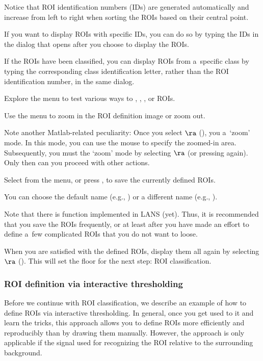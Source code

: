 \bul Notice that ROI identification numbers (IDs) are generated automatically and increase from left to right when sorting the ROIs based on their central point.

\bul If you want to display ROIs with specific IDs, you can do so by typing the IDs in the dialog that opens after you choose to display the ROIs.

\bul If the ROIs have been classified, you can display ROIs from a~specific class by typing the corresponding class identification letter, rather than the ROI identification number, in the same dialog.

\s Explore the  menu to test various ways to , , , or  ROIs.

\s Use the  menu to zoom in the ROI definition image or zoom out.

\bul Note another Matlab-related peculiarity: Once you select  $\ra$  (), you  a~`zoom' mode. In this mode, you can use the mouse to specify the zoomed-in area. Subsequently, you must  the `zoom' mode by selecting  $\ra$  (or pressing  again). Only then can you proceed with other actions.

\s Select  from the menu, or press , to save the currently defined ROIs. 

\bul You can choose the default name (e.g., ) or a different name (e.g., ).

\bul Note that there is  function implemented in LANS (yet). Thus, it is recommended that you save the ROIs frequently, or at least after you have made an effort to define a~few complicated ROIs that you do not want to loose.

\s When you are satisfied with the defined ROIs, display them all again by selecting  $\ra$  (). This will set the floor for the next step: ROI classification.


\subsubsection{ROI definition via interactive thresholding}
\setcounter{step}{0}

Before we continue with ROI classification, we describe an example of how to define ROIs via interactive thresholding. In general, once you get used to it and learn the tricks, this approach allows you to define ROIs more efficiently and reproducibly than by drawing them manually. However, the approach is only applicable if the signal used for recognizing the ROI  relative to the surrounding background.

